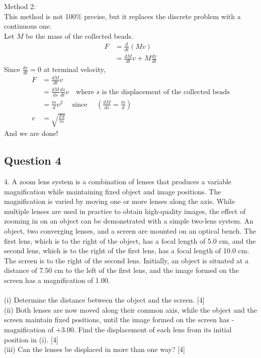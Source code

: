 \documentclass{article}
\begin{document}
Method 2: \\
This method is not 100\% precise, but it replaces the discrete problem with a continuous one. \\
Let $M$ be the mass of the collected beads.
\begin{align}
	F &= \frac{d}{dt} (Mv) \\
	&= \frac{dM}{dt} v + M \frac{dv}{dt}
\end{align}
Since $\frac{dv}{dt} = 0$ at terminal velocity,
\begin{align}
	F &= \frac{dM}{dt} v \\
	&= \frac{dM}{ds} \frac{ds}{dt} v \quad \text{where } s \text{ is the displacement of the collected beads}\\
	&= \frac{m}{d} v^2 \quad \text{ since }\quad \left(\frac{dM}{ds} = \frac{m}{d}\right)\\
	v &= \sqrt{\frac{Fd}{m}}
\end{align}
And we are done!

\subsection{Question 4}
4. A zoom lens system is a combination of lenses that produces a variable magnification while maintaining fixed object and image positions. The magnification is varied by moving one or more lenses along the axis. While multiple lenses are used in practice to obtain high-quality images, the effect of zooming in on an object can be demonstrated with a simple two-lens system. An object, two converging lenses, and a screen are mounted on an optical bench. The first lens, which is to the right of the object, has a focal length of 5.0 cm, and the second lens, which is to the right of the first lens, has a focal length of 10.0 cm. The screen is to the right of the second lens. Initially, an object is situated at a distance of 7.50 cm to the left of the first lens, and the image formed on the screen has a magnification of 1.00. \\
\\
(i) Determine the distance between the object and the screen. [4] \\
(ii) Both lenses are now moved along their common axis, while the object and the screen maintain fixed positions, until the image formed on the screen has - magnification of $+3.00$. Find the displacement of each lens from its initial position in (i). [4] \\
(iii) Can the lenses be displaced in more than one way? [4] \\
\end{document}
